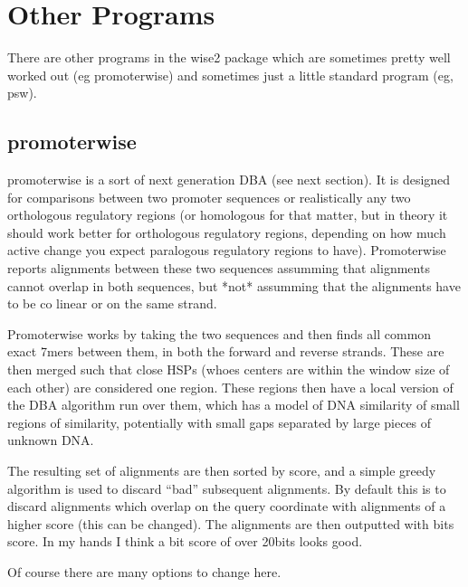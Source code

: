 \documentclass{article}
\begin{document}
\newpage
\section{Other Programs}

There are other programs in the wise2 package which are sometimes pretty
well worked out (eg promoterwise) and sometimes just a little standard program
(eg, psw).


\subsection{promoterwise}

promoterwise is a sort of next generation DBA (see next section). It
is designed for comparisons between two promoter sequences or
realistically any two orthologous regulatory regions (or homologous
for that matter, but in theory it should work better for orthologous
regulatory regions, depending on how much active change you expect
paralogous regulatory regions to have). Promoterwise reports alignments 
between these two sequences assumming that alignments cannot overlap in
both sequences, but *not* assumming that the alignments have to be co
linear or on the same strand.


Promoterwise works by taking the two sequences and then finds all
common exact 7mers between them, in both the forward and reverse
strands. These are then merged such that close HSPs (whoes centers are
within the window size of each other) are considered one region.
These regions then have a local version of the DBA algorithm run over
them, which has a model of DNA similarity of small regions of
similarity, potentially with small gaps separated by large pieces of
unknown DNA.


The resulting set of alignments are then sorted by score, and a simple
greedy algorithm is used to discard ``bad'' subsequent alignments. By
default this is to discard alignments which overlap on the query
coordinate with alignments of a higher score (this can be
changed). The alignments are then outputted with bits score. In my
hands I think a bit score of over 20bits looks good.


Of course there are many options to change here.
\end{document}
